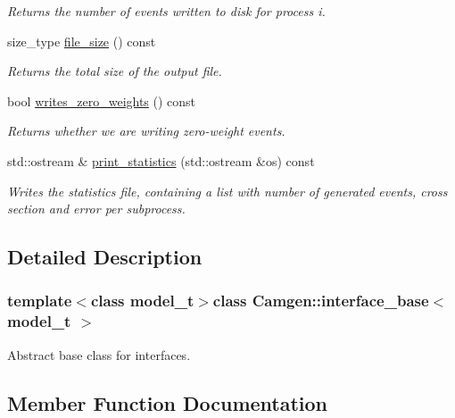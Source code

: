 \begin{DoxyCompactItemize}
\begin{DoxyCompactList}\small\item\em Returns the number of events written to disk for process i. \end{DoxyCompactList}\item 
\hypertarget{a00317_a361fefe2162c65d3d895d0cd883e3a15}{}size\+\_\+type \hyperlink{a00317_a361fefe2162c65d3d895d0cd883e3a15}{file\+\_\+size} () const \label{a00317_a361fefe2162c65d3d895d0cd883e3a15}

\begin{DoxyCompactList}\small\item\em Returns the total size of the output file. \end{DoxyCompactList}\item 
\hypertarget{a00317_a05a5504030f498f12c319e1ed0d069ad}{}bool \hyperlink{a00317_a05a5504030f498f12c319e1ed0d069ad}{writes\+\_\+zero\+\_\+weights} () const \label{a00317_a05a5504030f498f12c319e1ed0d069ad}

\begin{DoxyCompactList}\small\item\em Returns whether we are writing zero-\/weight events. \end{DoxyCompactList}\item 
std\+::ostream \& \hyperlink{a00317_a176422901fb2f6fcaa5b2d52fb211387}{print\+\_\+statistics} (std\+::ostream \&os) const 
\begin{DoxyCompactList}\small\item\em Writes the statistics file, containing a list with number of generated events, cross section and error per subprocess. \end{DoxyCompactList}\end{DoxyCompactItemize}


\subsection{Detailed Description}
\subsubsection*{template$<$class model\+\_\+t$>$class Camgen\+::interface\+\_\+base$<$ model\+\_\+t $>$}

Abstract base class for interfaces. 

\subsection{Member Function Documentation}
\hypertarget{a00317_a176422901fb2f6fcaa5b2d52fb211387}{}
